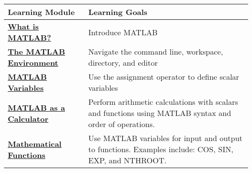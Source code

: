 \documentclass[11pt]{article}
\begin{document}
\begin{longtable}[]{@{}ll@{}}
\toprule
\begin{minipage}[b]{0.29\columnwidth}\raggedright\strut
\textbf{Learning Module}\strut
\end{minipage} & \begin{minipage}[b]{0.27\columnwidth}\raggedright\strut
\textbf{Learning Goals}\strut
\end{minipage}\tabularnewline
\midrule
\endhead
\begin{minipage}[t]{0.29\columnwidth}\raggedright\strut
\textbf{\href{http://youtu.be/rXwTiKGlilE}{What is MATLAB?}}\strut
\end{minipage} & \begin{minipage}[t]{0.27\columnwidth}\raggedright\strut
Introduce MATLAB\strut
\end{minipage}\tabularnewline
\begin{minipage}[t]{0.29\columnwidth}\raggedright\strut
\textbf{\href{http://youtu.be/iYTzJXXI9vI}{The MATLAB
Environment}}\strut
\end{minipage} & \begin{minipage}[t]{0.27\columnwidth}\raggedright\strut
Navigate the command line, workspace, directory, and editor\strut
\end{minipage}\tabularnewline
\begin{minipage}[t]{0.29\columnwidth}\raggedright\strut
\textbf{\href{http://youtu.be/jURDBsIPt5I}{MATLAB Variables}}\strut
\end{minipage} & \begin{minipage}[t]{0.27\columnwidth}\raggedright\strut
Use the assignment operator to define scalar variables\strut
\end{minipage}\tabularnewline
\begin{minipage}[t]{0.29\columnwidth}\raggedright\strut
\textbf{\href{http://youtu.be/E7KllorEWkA}{MATLAB as a
Calculator}}\strut
\end{minipage} & \begin{minipage}[t]{0.27\columnwidth}\raggedright\strut
Perform arithmetic calculations with scalars and functions using MATLAB
syntax and order of operations.\strut
\end{minipage}\tabularnewline
\begin{minipage}[t]{0.29\columnwidth}\raggedright\strut
\textbf{\href{http://youtu.be/R-kBvJ3kVVk}{Mathematical
Functions}}\strut
\end{minipage} & \begin{minipage}[t]{0.27\columnwidth}\raggedright\strut
Use MATLAB variables for input and output to functions. Examples
include: COS, SIN, EXP, and NTHROOT.\strut
\end{minipage}\tabularnewline
\bottomrule
\end{longtable}
\end{document}
